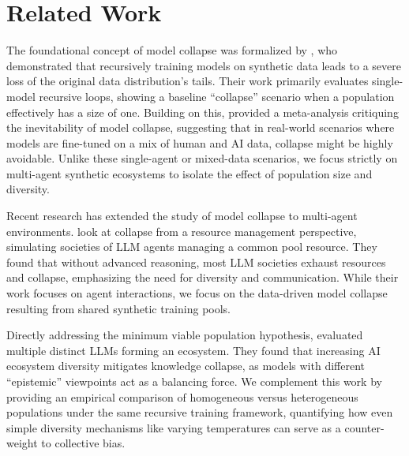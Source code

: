 \section{Related Work}
\label{sec:related}

 The foundational concept of model collapse was formalized by \citet{shumailov2024ai}, who demonstrated that recursively training models on synthetic data leads to a severe loss of the original data distribution's tails. Their work primarily evaluates single-model recursive loops, showing a baseline ``collapse'' scenario when a population effectively has a size of one. Building on this, \citet{schaeffer2025model} provided a meta-analysis critiquing the inevitability of model collapse, suggesting that in real-world scenarios where models are fine-tuned on a mix of human and AI data, collapse might be highly avoidable. Unlike these single-agent or mixed-data scenarios, we focus strictly on multi-agent synthetic ecosystems to isolate the effect of population size and diversity.

 Recent research has extended the study of model collapse to multi-agent environments. \citet{piatti2024cooperate} look at collapse from a resource management perspective, simulating societies of LLM agents managing a common pool resource. They found that without advanced reasoning, most LLM societies exhaust resources and collapse, emphasizing the need for diversity and communication. While their work focuses on agent interactions, we focus on the data-driven model collapse resulting from shared synthetic training pools.

 Directly addressing the minimum viable population hypothesis, \citet{hodel2025epistemic} evaluated multiple distinct LLMs forming an ecosystem. They found that increasing AI ecosystem diversity mitigates knowledge collapse, as models with different ``epistemic'' viewpoints act as a balancing force. We complement this work by providing an empirical comparison of homogeneous versus heterogeneous populations under the same recursive training framework, quantifying how even simple diversity mechanisms like varying temperatures can serve as a counter-weight to collective bias.
